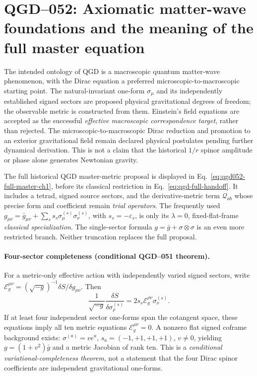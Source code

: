 \documentclass[11pt,a4paper]{article}
\begin{document}
\section{QGD--052: Axiomatic matter-wave foundations and the meaning of the full master equation}\label{sec:qgd052-ch1}
The intended ontology of QGD is a macroscopic quantum matter-wave phenomenon, with the
Dirac equation a preferred microscopic-to-macroscopic starting point.  The natural-invariant
one-form $\sigma_\mu$ and its independently established signed sectors are proposed
physical gravitational degrees of freedom; the observable metric is constructed from them.
Einstein's field equations are accepted as the successful \emph{effective macroscopic
correspondence target}, rather than rejected.  The microscopic-to-macroscopic Dirac
reduction and promotion to an exterior gravitational field remain declared physical
postulates pending further dynamical derivation.  This is not a claim that the historical
$1/r$ spinor amplitude or phase alone generates Newtonian gravity.

The full historical QGD master-metric proposal is displayed in Eq.~\eqref{eq:qgd052-full-master-ch1}, before its classical restriction in Eq.~\eqref{eq:qgd-full-handoff}.  It includes a tetrad, signed source sectors, and the derivative-metric term $\mathcal Q_{ab}$ whose precise form and coefficient remain \emph{trial operators}.
The frequently used $g_{\mu\nu}=\bar g_{\mu\nu}+\sum_s
s_s\sigma^{(s)}_\mu\sigma^{(s)}_\nu$, with $s_s=-\varepsilon_s$, is only its
$\lambda=0$, fixed-flat-frame \emph{classical specialization}.  The
single-sector formula $g=\bar g+\sigma\otimes\sigma$ is an even more restricted
branch.  Neither truncation replaces the full proposal.

\paragraph{Four-sector completeness (conditional QGD--051 theorem).}
For a metric-only effective action with independently varied signed sectors,
write $\mathcal E_g^{\mu\nu}=(\sqrt{-g})^{-1}\delta S/\delta g_{\mu\nu}$.
Then
\begin{equation}\label{eq:qgd052-ch1-projection}
 \frac1{\sqrt{-g}}\frac{\delta S}{\delta\sigma^{(s)}_\rho}
 =2s_s\mathcal E_g^{\rho\nu}\sigma^{(s)}_\nu.
\end{equation}
If at least four independent sector one-forms span the cotangent space, these
equations imply all ten metric equations $\mathcal E_g^{\mu\nu}=0$.
A nonzero flat signed coframe background exists:
$\sigma^{(a)}=v e^a$, $s_a=(-1,+1,+1,+1)$, $v\ne0$, yielding
$g=(1+v^2)\bar g$ and a metric Jacobian of rank ten.  This is a
\emph{conditional variational-completeness theorem}, not a statement that the four
Dirac spinor coefficients are independent gravitational one-forms.
\end{document}
